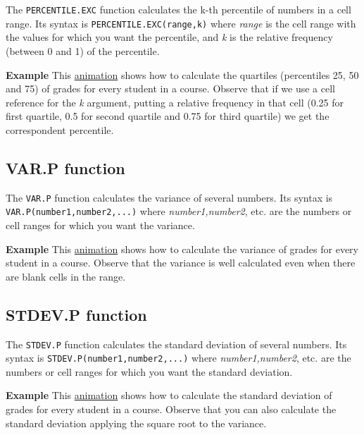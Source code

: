 The \texttt{PERCENTILE.EXC} function calculates the k-th percentile of numbers in a cell range. Its syntax is \texttt{PERCENTILE.EXC(range,k)} where \emph{range} is the cell range with the values for which you want the percentile, and \emph{k} is the relative frequency (between 0 and 1) of the percentile.

\textbf{Example} This \href{http://aprendeconalf.es/office/excel/manual/img/example_function_percentile.gif}{animation} shows how to calculate the quartiles (percentiles 25, 50 and 75) of grades for every student in a course. Observe that if we use a cell reference for the \emph{k} argument, putting a relative frequency in that cell (0.25 for first quartile, 0.5 for second quartile and 0.75 for third quartile) we get the correspondent percentile.

\subsection{VAR.P function}\hypertarget{varp-function}{}\label{varp-function}

The \texttt{VAR.P} function calculates the variance of several numbers. Its syntax is \texttt{VAR.P(number1,number2,...)} where \emph{number1,number2}, etc. are the numbers or cell ranges for which you want the variance.

\textbf{Example} This \href{http://aprendeconalf.es/office/excel/manual/img/example_function_varp.gif}{animation} shows how to calculate the variance of grades for every student in a course. Observe that the variance is well calculated even when there are blank cells in the range.

\subsection{STDEV.P function}\hypertarget{stdevp-function}{}\label{stdevp-function}

The \texttt{STDEV.P} function calculates the standard deviation of several numbers. Its syntax is \texttt{STDEV.P(number1,number2,...)} where \emph{number1,number2}, etc. are the numbers or cell ranges for which you want the standard deviation.

\textbf{Example} This \href{http://aprendeconalf.es/office/excel/manual/img/example_function_stdevp.gif}{animation} shows how to calculate the standard deviation of grades for every student in a course. Observe that you can also calculate the standard deviation applying the square root to the variance.

